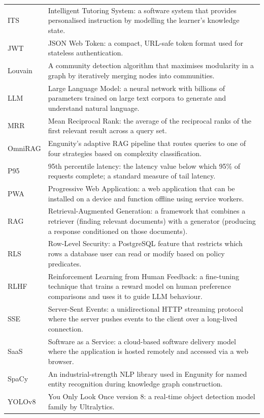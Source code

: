 \begin{longtable}{p{3.5cm} p{8cm}}
    ITS             & Intelligent Tutoring System: a software system that provides personalised instruction by modelling the learner's knowledge state. \\
    JWT             & JSON Web Token: a compact, URL-safe token format used for stateless authentication. \\
    Louvain         & A community detection algorithm that maximises modularity in a graph by iteratively merging nodes into communities. \\
    LLM             & Large Language Model: a neural network with billions of parameters trained on large text corpora to generate and understand natural language. \\
    MRR             & Mean Reciprocal Rank: the average of the reciprocal ranks of the first relevant result across a query set. \\
    OmniRAG         & Engunity's adaptive RAG pipeline that routes queries to one of four strategies based on complexity classification. \\
    P95             & 95th percentile latency: the latency value below which 95\% of requests complete; a standard measure of tail latency. \\
    PWA             & Progressive Web Application: a web application that can be installed on a device and function offline using service workers. \\
    RAG             & Retrieval-Augmented Generation: a framework that combines a retriever (finding relevant documents) with a generator (producing a response conditioned on those documents). \\
    RLS             & Row-Level Security: a PostgreSQL feature that restricts which rows a database user can read or modify based on policy predicates. \\
    RLHF            & Reinforcement Learning from Human Feedback: a fine-tuning technique that trains a reward model on human preference comparisons and uses it to guide LLM behaviour. \\
    SSE             & Server-Sent Events: a unidirectional HTTP streaming protocol where the server pushes events to the client over a long-lived connection. \\
    SaaS            & Software as a Service: a cloud-based software delivery model where the application is hosted remotely and accessed via a web browser. \\
    SpaCy           & An industrial-strength NLP library used in Engunity for named entity recognition during knowledge graph construction. \\
    YOLOv8          & You Only Look Once version 8: a real-time object detection model family by Ultralytics. \\
\end{longtable}


